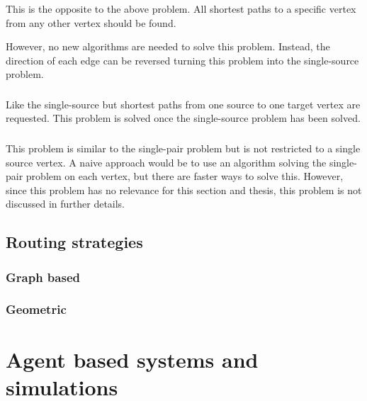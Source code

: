 		
		\subsubsection{}
		
			This is the opposite to the above problem.
			All shortest paths to a specific vertex from any other vertex should be found.
			
			However, no new algorithms are needed to solve this problem.
			Instead, the direction of each edge can be reversed turning this problem into the single-source problem.
		
		\subsubsection{}
		
			Like the single-source but shortest paths from one source to one target vertex are requested.
			This problem is solved once the single-source problem has been solved.
		
		\subsubsection{}
		
			This problem is similar to the single-pair problem but is not restricted to a single source vertex.
			A naive approach would be to use an algorithm solving the single-pair problem on each vertex, but there are faster ways to solve this.
			However, since this problem has no relevance for this section and thesis, this problem is not discussed in further details.
	
	\subsection{Routing strategies}
	
		\subsubsection{Graph based}
		
		\subsubsection{Geometric}
		\label{subsubsec:geometric-routing}

\section{Agent based systems and simulations}